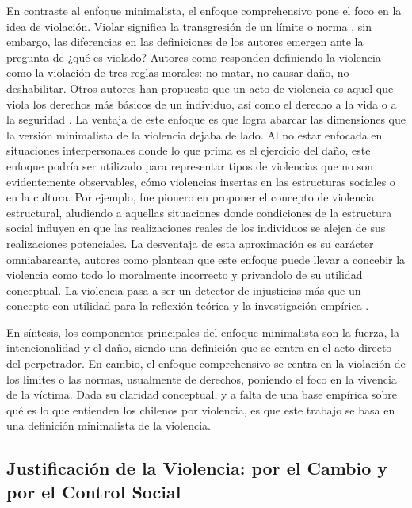 \documentclass[12pt,twoside]{templates/facsothesis}
\begin{document}
En contraste al enfoque minimalista, el enfoque comprehensivo pone el foco en la idea de violación. Violar significa la transgresión de un límite o norma \citep{Bufacchi2005, Bufacchi2007}, sin embargo, las diferencias en las definiciones de los autores emergen ante la pregunta de ¿qué es violado? Autores como \citet{Gerd1969} responden definiendo la violencia como la violación de tres reglas morales: no matar, no causar daño, no deshabilitar. Otros autores han propuesto que un acto de violencia es aquel que viola los derechos más básicos de un individuo, así como el derecho a la vida o a la seguridad \citep{Copoeru2020}. La ventaja de este enfoque es que logra abarcar las dimensiones que la versión minimalista de la violencia dejaba de lado. Al no estar enfocada en situaciones interpersonales donde lo que prima es el ejercicio del daño, este enfoque podría ser utilizado para representar tipos de violencias que no son evidentemente observables, cómo violencias insertas en las estructuras sociales o en la cultura. Por ejemplo, \citet{Galtung1969} fue pionero en proponer el concepto de violencia estructural, aludiendo a aquellas situaciones donde condiciones de la estructura social influyen en que las realizaciones reales de los individuos se alejen de sus realizaciones potenciales. La desventaja de esta aproximación es su carácter omniabarcante, autores como \citet{Bufacchi2005} plantean que este enfoque puede llevar a concebir la violencia como todo lo moralmente incorrecto y privandolo de su utilidad conceptual. La violencia pasa a ser un detector de injusticias más que un concepto con utilidad para la reflexión teórica y la investigación empírica \citep{Arostegui1994}.

En síntesis, los componentes principales del enfoque minimalista son la fuerza, la intencionalidad y el daño, siendo una definición que se centra en el acto directo del perpetrador. En cambio, el enfoque comprehensivo se centra en la violación de los limites o las normas, usualmente de derechos, poniendo el foco en la vivencia de la víctima. Dada su claridad conceptual, y a falta de una base empírica sobre qué es lo que entienden los chilenos por violencia, es que este trabajo se basa en una definición minimalista de la violencia.

\hypertarget{justificaciuxf3n-de-la-violencia-por-el-cambio-y-por-el-control-social}{%
\subsection{Justificación de la Violencia: por el Cambio y por el Control Social}\label{justificaciuxf3n-de-la-violencia-por-el-cambio-y-por-el-control-social}}
\end{document}
